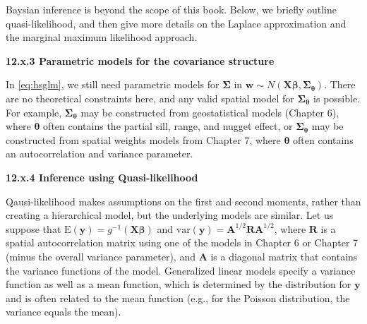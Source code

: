 \documentclass[12pt, titlepage]{article}
\begin{document}
Baysian inference is beyond the scope of this book. Below, we briefly outline quasi-likelihood, and then give more details on the Laplace approximation and the marginal maximum likelihood approach.



{\large \flushleft \textbf{12.x.3 Parametric models for the covariance structure}}

In \eqref{eq:hsglm}, we still need parametric models for $\boldsymbol{\Sigma}$ in $\mathbf{w} \sim N(\mathbf{X}\boldsymbol{\beta},\boldsymbol{\Sigma}_{\boldsymbol{\theta}})$.  There are no theoretical constraints here, and any valid spatial model for $\boldsymbol{\Sigma}_{\boldsymbol{\theta}}$ is possible. For example, $\boldsymbol{\Sigma}_{\boldsymbol{\theta}}$ may be constructed from geostatistical models (Chapter 6), where $\boldsymbol{\theta}$ often contains the partial sill, range, and nugget effect, or $\boldsymbol{\Sigma}_{\boldsymbol{\theta}}$ may be constructed from spatial weights models from Chapter 7, where $\boldsymbol{\theta}$ often contains an autocorrelation and variance parameter.


{\large \flushleft \textbf{12.x.4 Inference using Quasi-likelihood}}

Qausi-likelihood makes assumptions on the first and second moments, rather than creating a hierarchical model, but the underlying models are similar.  Let us suppose that $\textrm{E}(\mathbf{y}) = g^{-1}(\mathbf{\mathbf{X}\boldsymbol{\beta}})$ and $\textrm{var}(\mathbf{y}) = \mathbf{A}^{1/2}\mathbf{R}\mathbf{A}^{1/2}$, where $\mathbf{R}$ is a spatial autocorrelation matrix using one of the models in Chapter 6 or Chapter 7 (minus the overall variance parameter), and $\mathbf{A}$ is a diagonal matrix that contains the variance functions of the model.  Generalized linear models specify a variance function as well as a mean function, which is determined by the distribution for $\mathbf{y}$ and is often related to the mean function (e.g., for the Poisson distribution, the variance equals the mean).  
\end{document}

